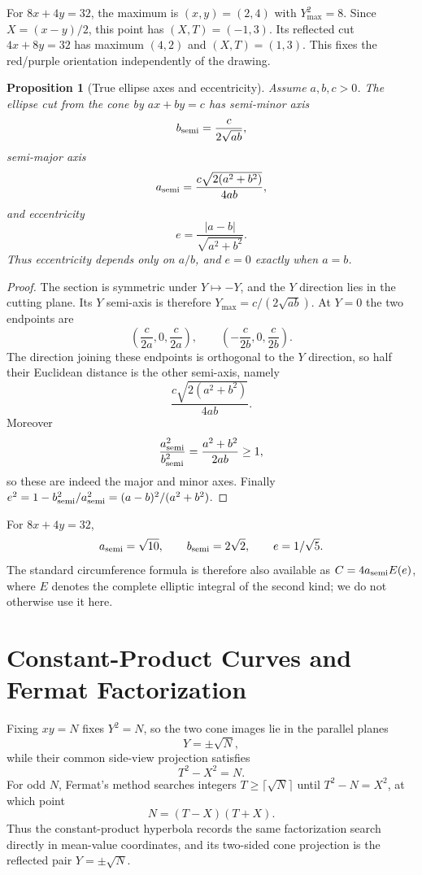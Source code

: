 \documentclass[11pt]{amsart}
\newtheorem{proposition}[theorem]{Proposition}
\theoremstyle{remark}
\begin{document}
For $8x+4y=32$, the maximum is $(x,y)=(2,4)$ with $Y^2_{\max}=8$. Since $X=(x-y)/2$, this point has $(X,T)=(-1,3)$. Its reflected cut $4x+8y=32$ has maximum $(4,2)$ and $(X,T)=(1,3)$. This fixes the red/purple orientation independently of the drawing.

\begin{proposition}[True ellipse axes and eccentricity]\label{prop:trueaxes}
Assume $a,b,c>0$. The ellipse cut from the cone by $ax+by=c$ has semi-minor axis
\[
b_{\rm semi}=\frac{c}{2\sqrt{ab}},
\]
semi-major axis
\[
a_{\rm semi}=\frac{c\sqrt{2(a^2+b^2)}}{4ab},
\]
and eccentricity
\[
e=\frac{|a-b|}{\sqrt{a^2+b^2}}.
\]
Thus eccentricity depends only on $a/b$, and $e=0$ exactly when $a=b$.
\end{proposition}
\begin{proof}
The section is symmetric under $Y\mapsto-Y$, and the $Y$ direction lies in the cutting plane. Its $Y$ semi-axis is therefore $Y_{\max}=c/(2\sqrt{ab})$. At $Y=0$ the two endpoints are
\[
\left(\frac{c}{2a},0,\frac{c}{2a}\right),\qquad
\left(-\frac{c}{2b},0,\frac{c}{2b}\right).
\]
The direction joining these endpoints is orthogonal to the $Y$ direction, so half their Euclidean distance is the other semi-axis, namely
\[
\frac{c\sqrt{2(a^2+b^2)}}{4ab}.
\]
Moreover
\[
\frac{a_{\rm semi}^2}{b_{\rm semi}^2}=\frac{a^2+b^2}{2ab}\ge1,
\]
so these are indeed the major and minor axes. Finally $e^2=1-b_{\rm semi}^2/a_{\rm semi}^2=(a-b)^2/(a^2+b^2)$.
\end{proof}

For $8x+4y=32$,
\[
a_{\rm semi}=\sqrt{10},\qquad b_{\rm semi}=2\sqrt2,\qquad e=1/\sqrt5.
\]
The standard circumference formula is therefore also available as $C=4a_{\rm semi}E(e)$, where $E$ denotes the complete elliptic integral of the second kind; we do not otherwise use it here.

\section{Constant-Product Curves and Fermat Factorization}
Fixing $xy=N$ fixes $Y^2=N$, so the two cone images lie in the parallel planes
\[
Y=\pm\sqrt N,
\]
while their common side-view projection satisfies
\begin{equation}
T^2-X^2=N. \tag{4.1}
\end{equation}
For odd $N$, Fermat's method searches integers $T\ge\lceil\sqrt N\rceil$ until $T^2-N=X^2$, at which point
\[
N=(T-X)(T+X).
\]
Thus the constant-product hyperbola records the same factorization search directly in mean-value coordinates, and its two-sided cone projection is the reflected pair $Y=\pm\sqrt N$.
\end{document}
